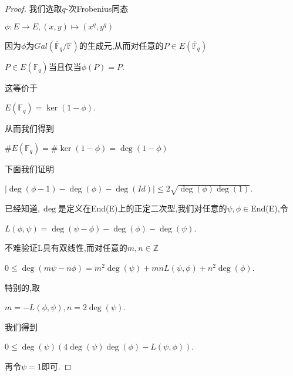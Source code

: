 \documentclass[11pt]{ctexart}
\DeclareMathOperator{\Deg}{deg}
\begin{document}
\begin{proof}我们选取$q$-次Frobenius同态
\begin{center}
    $\phi :E \rightarrow E$$,(x,y)\mapsto (x^q,y^q)$
\end{center}
\noindent 因为$\phi$为$Gal(\overline{\mathbb{F}}_q/\mathbb{F})$的生成元,从而对任意的$P\in E(\overline{\mathbb{F}}_q)$
\begin{center}
    $P \in E(\mathbb{F}_q)$当且仅当$\phi(P)=P$.
\end{center}
\noindent 这等价于
\begin{center}
    $E(\mathbb{F}_q)=\ker(1-\phi)$.
\end{center}
\noindent 从而我们得到
\begin{center}
    $\#E(\mathbb{F}_q)=\#\ker(1-\phi)=\Deg(1-\phi)$
\end{center}
\noindent 下面我们证明
\begin{center}
    $|\Deg(\phi-1)-\Deg(\phi)-\Deg(Id)|\leqslant 2\sqrt{\Deg(\phi)\Deg(1)}$.
\end{center}
\noindent 已经知道$,\Deg$是定义在End(E)上的正定二次型,我们对任意的$\psi, \phi \in $End(E),令
\begin{center}
    $L(\phi,\psi)=\Deg(\psi-\phi)-\Deg(\phi)-\Deg(\psi)$.
\end{center}
\noindent 不难验证L具有双线性,而对任意的$m,n\in\mathbb{Z}$
\begin{center}
    $0\leqslant \Deg(m\psi-n\phi)=m^2\Deg(\psi)+mnL(\psi,\phi)+n^2\Deg(\phi) $.

\end{center}
\noindent 特别的,取
\begin{center}
    $m=-L(\phi,\psi),n=2\Deg(\psi)$.
\end{center}
\noindent 我们得到
\begin{center}
   $ 0\leqslant \Deg(\psi)(4\Deg(\psi)\Deg(\phi)-L(\psi,\phi))$. 
\end{center}
\noindent 再令$\psi =1$即可.
\end{proof}
\end{document}
